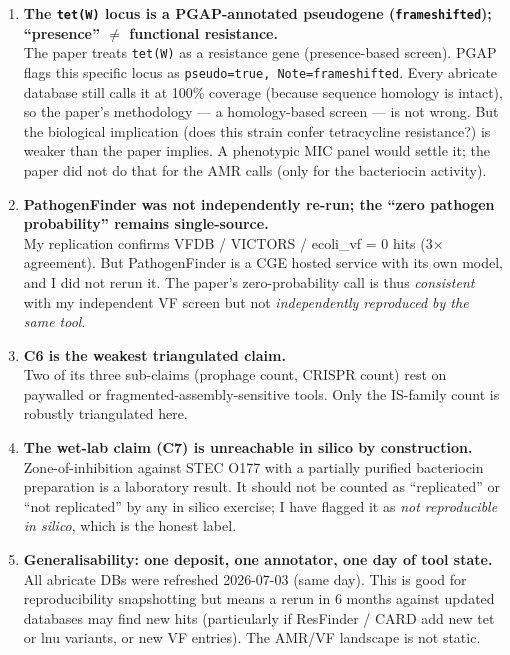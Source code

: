 \documentclass[11pt,letterpaper]{article}
\begin{document}
\begin{enumerate}[leftmargin=1.6em]
  \item \textbf{The \texttt{tet(W)} locus is a PGAP-annotated pseudogene (\texttt{frameshifted}); ``presence'' $\ne$ functional resistance.} \\
  The paper treats \texttt{tet(W)} as a resistance gene (presence-based screen). PGAP flags this specific locus as \texttt{pseudo=true, Note=frameshifted}. Every abricate database still calls it at 100\% coverage (because sequence homology is intact), so the paper's methodology --- a homology-based screen --- is not wrong. But the biological implication (does this strain confer tetracycline resistance?) is weaker than the paper implies. A phenotypic MIC panel would settle it; the paper did not do that for the AMR calls (only for the bacteriocin activity).

  \item \textbf{PathogenFinder was not independently re-run; the ``zero pathogen probability'' remains single-source.} \\
  My replication confirms VFDB / VICTORS / ecoli\_vf = 0 hits (3$\times$ agreement). But PathogenFinder is a CGE hosted service with its own model, and I did not rerun it. The paper's zero-probability call is thus \emph{consistent} with my independent VF screen but not \emph{independently reproduced by the same tool}.

  \item \textbf{C6 is the weakest triangulated claim.} \\
  Two of its three sub-claims (prophage count, CRISPR count) rest on paywalled or fragmented-assembly-sensitive tools. Only the IS-family count is robustly triangulated here.

  \item \textbf{The wet-lab claim (C7) is unreachable in silico by construction.} \\
  Zone-of-inhibition against STEC O177 with a partially purified bacteriocin preparation is a laboratory result. It should not be counted as ``replicated'' or ``not replicated'' by any in silico exercise; I have flagged it as \emph{not reproducible in silico}, which is the honest label.

  \item \textbf{Generalisability: one deposit, one annotator, one day of tool state.} \\
  All abricate DBs were refreshed 2026-07-03 (same day). This is good for reproducibility snapshotting but means a rerun in 6 months against updated databases may find new hits (particularly if ResFinder / CARD add new tet or lnu variants, or new VF entries). The AMR/VF landscape is not static.

\end{enumerate}
\end{document}
